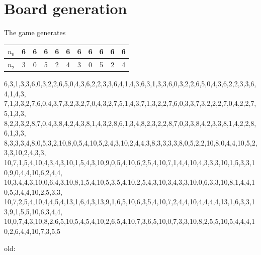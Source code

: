 \documentclass[a4paper,12pt]{article}
\begin{document}
\section{Board generation}

The game generates 

\begin{tabular}{c|c|c|c|c|c|c|c|c|c|c}
$n_0$ & 6 & 6 & 6 & 6 & 6 & 6 & 6 & 6 & 6 & 6 \\
\hline
$n_2$ & 3 & 0 & 5 & 2 & 4 & 3 & 0 & 5 & 2 & 4 \\
\end{tabular}

	{{6,3,1,3,3},{6,0,3,2,2},{6,5,0,4,3},{6,2,2,3,3},{6,4,1,4,3},{6,3,1,3,3},{6,0,3,2,2},{6,5,0,4,3},{6,2,2,3,3},{6,4,1,4,3}},
	{{7,1,3,3,2},{7,6,0,4,3},{7,3,2,3,2},{7,0,4,3,2},{7,5,1,4,3},{7,1,3,2,2},{7,6,0,3,3},{7,3,2,2,2},{7,0,4,2,2},{7,5,1,3,3}},
	{{8,2,3,3,2},{8,7,0,4,3},{8,4,2,4,3},{8,1,4,3,2},{8,6,1,3,4},{8,2,3,2,2},{8,7,0,3,3},{8,4,2,3,3},{8,1,4,2,2},{8,6,1,3,3}},
	{{8,3,3,3,4},{8,0,5,3,2},{10,8,0,5,4},{10,5,2,4,3},{10,2,4,4,3},{8,3,3,3,3},{8,0,5,2,2},{10,8,0,4,4},{10,5,2,3,3},{10,2,4,3,3}},
	{{10,7,1,5,4},{10,4,3,4,3},{10,1,5,4,3},{10,9,0,5,4},{10,6,2,5,4},{10,7,1,4,4},{10,4,3,3,3},{10,1,5,3,3},{10,9,0,4,4},{10,6,2,4,4}},
	{{10,3,4,4,3},{10,0,6,4,3},{10,8,1,5,4},{10,5,3,5,4},{10,2,5,4,3},{10,3,4,3,3},{10,0,6,3,3},{10,8,1,4,4},{10,5,3,4,4},{10,2,5,3,3}},
	{{10,7,2,5,4},{10,4,4,5,4},{13,1,6,4,3},{13,9,1,6,5},{10,6,3,5,4},{10,7,2,4,4},{10,4,4,4,4},{13,1,6,3,3},{13,9,1,5,5},{10,6,3,4,4}},
	{{10,0,7,4,3},{10,8,2,6,5},{10,5,4,5,4},{10,2,6,5,4},{10,7,3,6,5},{10,0,7,3,3},{10,8,2,5,5},{10,5,4,4,4},{10,2,6,4,4},{10,7,3,5,5}}

\newpage

old:
\end{document}
